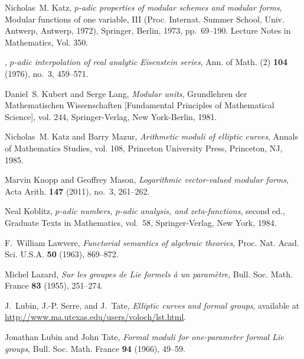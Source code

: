 \documentclass{gtpart}
\theoremstyle{definition}
\theoremstyle{remark}
\renewcommand{\=}{\approx}
\renewcommand{\-}{\sim}
\numberwithin{equation}{section}
\numberwithin{thm}{section}
\begin{document}
\begin{thebibliography}
Nicholas~M. Katz, \emph{{$p$}-adic properties of modular schemes and modular
  forms}, Modular functions of one variable, {III} ({P}roc. {I}nternat.
  {S}ummer {S}chool, {U}niv. {A}ntwerp, {A}ntwerp, 1972), Springer, Berlin,
  1973, pp.~69--190. Lecture Notes in Mathematics, Vol. 350. 

\bysame, \emph{{$p$}-adic interpolation of real analytic {E}isenstein series},
  Ann. of Math. (2) \textbf{104} (1976), no.~3, 459--571. 

Daniel~S. Kubert and Serge Lang, \emph{Modular units}, Grundlehren der
  Mathematischen Wissenschaften [Fundamental Principles of Mathematical
  Science], vol. 244, Springer-Verlag, New York-Berlin, 1981. 

Nicholas~M. Katz and Barry Mazur, \emph{Arithmetic moduli of elliptic curves},
  Annals of Mathematics Studies, vol. 108, Princeton University Press,
  Princeton, NJ, 1985. 

Marvin Knopp and Geoffrey Mason, \emph{Logarithmic vector-valued modular
  forms}, Acta Arith. \textbf{147} (2011), no.~3, 261--262. 

Neal Koblitz, \emph{{$p$}-adic numbers, {$p$}-adic analysis, and
  zeta-functions}, second ed., Graduate Texts in Mathematics, vol.~58,
  Springer-Verlag, New York, 1984. 

F.~William Lawvere, \emph{Functorial semantics of algebraic theories}, Proc.
  Nat. Acad. Sci. U.S.A. \textbf{50} (1963), 869--872. 

Michel Lazard, \emph{Sur les groupes de {L}ie formels \`a un param\`etre},
  Bull. Soc. Math. France \textbf{83} (1955), 251--274. 

J.~Lubin, J.-P. Serre, and J.~Tate, \emph{Elliptic curves and formal groups}, 
  available at \href{http://www.ma.utexas.edu/users/voloch/lst.html}{http://www.ma.utexas.edu/users/voloch/lst.html}.

Jonathan Lubin and John Tate, \emph{Formal moduli for one-parameter formal
  {L}ie groups}, Bull. Soc. Math. France \textbf{94} (1966), 49--59.


\end{thebibliography}
\end{document}
